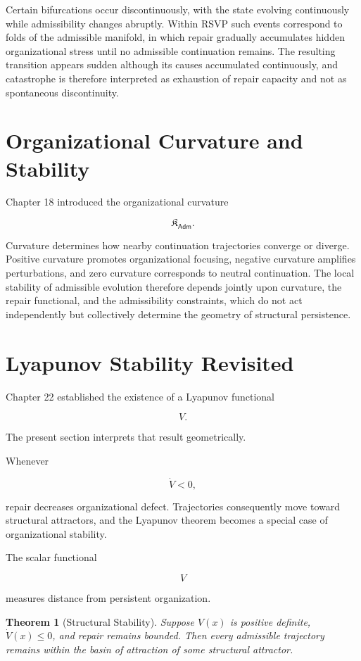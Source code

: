 \documentclass[11pt,oneside]{book}
\numberwithin{equation}{chapter}
\theoremstyle{definition}
\theoremstyle{plain}
\newtheorem{theorem}[definition]{Theorem}
\newcommand{\Adm}{\mathsf{Adm}}
\begin{document}
Certain bifurcations occur discontinuously, with the state evolving continuously while admissibility changes abruptly. Within RSVP such events correspond to folds of the admissible manifold, in which repair gradually accumulates hidden organizational stress until no admissible continuation remains. The resulting transition appears sudden although its causes accumulated continuously, and catastrophe is therefore interpreted as exhaustion of repair capacity and not as spontaneous discontinuity.

\section{Organizational Curvature and Stability}

Chapter 18 introduced the organizational curvature

\[
\mathfrak K_\Adm.
\]

Curvature determines how nearby continuation trajectories converge or diverge. Positive curvature promotes organizational focusing, negative curvature amplifies perturbations, and zero curvature corresponds to neutral continuation. The local stability of admissible evolution therefore depends jointly upon curvature, the repair functional, and the admissibility constraints, which do not act independently but collectively determine the geometry of structural persistence.

\section{Lyapunov Stability Revisited}

Chapter 22 established the existence of a Lyapunov functional

\[
V.
\]

The present section interprets that result geometrically.

Whenever

\[
\dot V < 0,
\]

repair decreases organizational defect. Trajectories consequently move toward structural attractors, and the Lyapunov theorem becomes a special case of organizational stability.

The scalar functional

\[
V
\]

measures distance from persistent organization.

\begin{theorem}[Structural Stability]
Suppose \(V(x)\) is positive definite, \(\dot V(x)\le 0\), and repair
remains bounded. Then every admissible trajectory remains within the basin
of attraction of some structural attractor.
\end{theorem}
\end{document}
